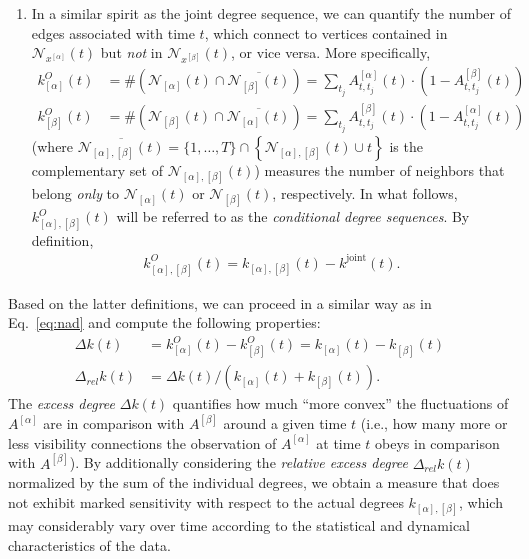 \begin{enumerate}
\item In a similar spirit as the joint degree sequence, we can quantify the number of edges associated with time $t$, which connect to vertices contained in $\mathcal{N}_{x^{[\alpha]}}(t)$ but \textit{not} in $\mathcal{N}_{x^{[\beta]}}(t)$, or vice versa. More specifically,
\begin{align}
k_{{[\alpha]}}^{O}(t) & = \# \left( \mathcal{N}_{{[\alpha]}}(t) \cap \overline{\mathcal{N}_{{[\beta]}}(t)} \right)  =  \sum_{t_j} A_{t,t_j}^{{[\alpha]}}(t)\cdot \left( 1-A_{t,t_j}^{{[\beta]}}(t) \right) \\
k_{{[\beta]}}^{O}(t) & = \# \left( \mathcal{N}_{{[\beta]}}(t) \cap \overline{\mathcal{N}_{{[\alpha]}}(t)} \right) = \sum_{t_j} A_{t,t_j}^{{[\beta]}}(t)\cdot \left(1-A_{t,t_j}^{{[\alpha]}}(t) \right)
\end{align}
(where $\overline{\mathcal{N}_{{[\alpha]}, {[\beta]}}(t)}=\{1,\ldots,T\}\cap \left\{ \mathcal{N}_{{[\alpha]}, {[\beta]}}(t)\cup t\right\}$ is the complementary set of $\mathcal{N}_{{[\alpha]}, {[\beta]}}(t)$) measures the number of neighbors that belong \textit{only} to $\mathcal{N}_{{[\alpha]}}(t)$ or $\mathcal{N}_{{[\beta]}}(t)$, respectively. In what follows, $k_{{[\alpha]}, {[\beta]}}^{O}(t)$ will be referred to as the \textit{conditional degree sequences}. By definition,
\begin{align}\label{eq:nad}
k_{{[\alpha]}, {[\beta]}}^{O}(t)=k_{{[\alpha]}, {[\beta]}}(t)-k^\textrm{joint}(t).
\end{align}
\end{enumerate}

Based on the latter definitions, we can proceed in a similar way as in Eq.~\eqref{eq:nad} and compute the following properties:
\begin{align} \label{eq:deltaK}
\Delta k(t) &= k_{{[\alpha]}}^{O}(t) - k_{{[\beta]}}^{O}(t) = k_{{[\alpha]}}(t) - k_{{[\beta]}}(t) \\ \label{eq:deltaReK}
\Delta_{rel} k(t) &= \Delta k(t)/\left(k_{{[\alpha]}}(t) + k_{{[\beta]}}(t) \right).
\end{align}
The \textit{excess degree} $\Delta k(t)$ quantifies how much ``more convex'' the fluctuations of $A^{[\alpha]}$ are in comparison with $A^{[\beta]}$ around a given time $t$ (i.e., how many more or less visibility connections the observation of $A^{[\alpha]}$ at time $t$ obeys in comparison with $A^{[\beta]}$). By additionally considering the \textit{relative excess degree} $\Delta_{rel} k(t)$ normalized by the sum of the individual degrees, we obtain a measure that does not exhibit marked sensitivity with respect to the actual degrees $k_{{[\alpha]}, {[\beta]}}$, which may considerably vary over time according to the statistical and dynamical characteristics of the data.

